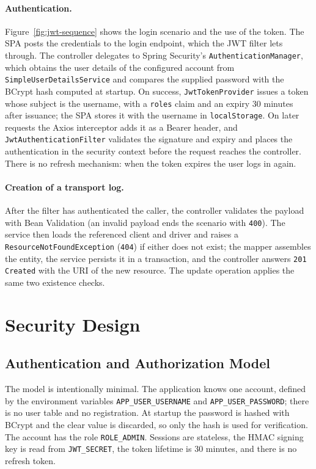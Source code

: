 \paragraph{Authentication.} Figure~\ref{fig:jwt-sequence} shows the login scenario and the use of the token. The SPA posts the credentials to the login endpoint, which the JWT filter lets through. The controller delegates to Spring Security's \texttt{AuthenticationManager}, which obtains the user details of the configured account from \texttt{SimpleUserDetailsService} and compares the supplied password with the BCrypt hash computed at startup. On success, \texttt{JwtTokenProvider} issues a token whose subject is the username, with a \texttt{roles} claim and an expiry 30 minutes after issuance; the SPA stores it with the username in \texttt{localStorage}. On later requests the Axios interceptor adds it as a Bearer header, and \texttt{JwtAuthenticationFilter} validates the signature and expiry and places the authentication in the security context before the request reaches the controller. There is no refresh mechanism: when the token expires the user logs in again.



\paragraph{Creation of a transport log.} After the filter has authenticated the caller, the controller validates the payload with Bean Validation (an invalid payload ends the scenario with \texttt{400}). The service then loads the referenced client and driver and raises a \texttt{ResourceNotFoundException} (\texttt{404}) if either does not exist; the mapper assembles the entity, the service persists it in a transaction, and the controller answers \texttt{201 Created} with the URI of the new resource. The update operation applies the same two existence checks.

\section{Security Design}

\subsection{Authentication and Authorization Model}

The model is intentionally minimal. The application knows one account, defined by the environment variables \texttt{APP\_USER\_USERNAME} and \texttt{APP\_USER\_PASSWORD}; there is no user table and no registration. At startup the password is hashed with BCrypt and the clear value is discarded, so only the hash is used for verification. The account has the role \texttt{ROLE\_ADMIN}. Sessions are stateless, the HMAC signing key is read from \texttt{JWT\_SECRET}, the token lifetime is 30 minutes, and there is no refresh token.

